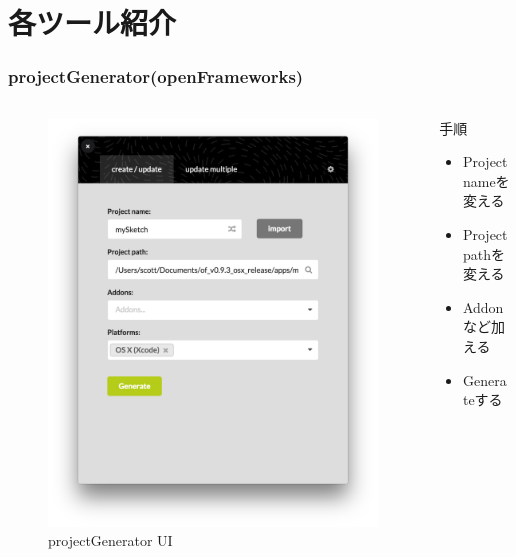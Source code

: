 \documentclass[10pt, dvipdfmx]{beamer}
\begin{document}
    \section{各ツール紹介}
        \begin{frame}
            \frametitle{projectGenerator(openFrameworks)}
            \tiny
            \begin{columns}[c]
                \begin{column}{0.50\textwidth}
                    \begin{figure}[htb]
                        \includegraphics[width=\columnwidth]{images/01.png}
                        \caption{projectGenerator UI}
                        \label{fig:01}
                    \end{figure}
                \end{column}
                \begin{column}{0.50\textwidth}
                    \begin{block}{手順}
                        \begin{itemize}
                            \item Project nameを変える
                            \item Project pathを変える
                            \item Addonなど加える
                            \item Generateする
                        \end{itemize}
                    \end{block}
                \end{column}
            \end{columns}
        \end{frame}
\end{document}
